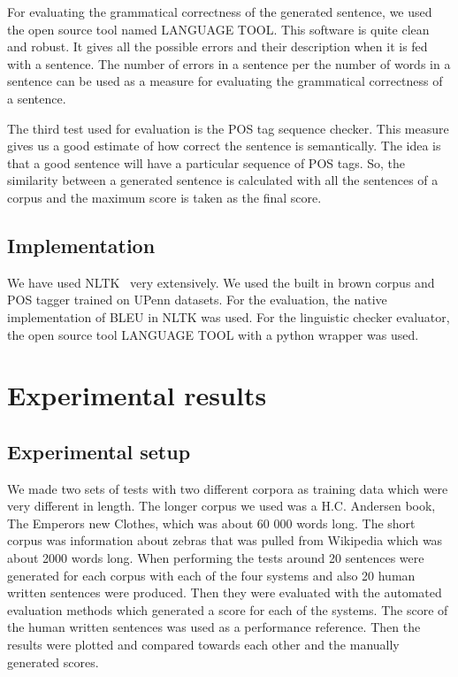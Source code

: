 \documentclass[a4paper,12pt]{article}
\begin{document}
For evaluating the grammatical correctness of the generated sentence, we used the
open source tool named LANGUAGE TOOL. This software is quite clean and robust. It gives 
all the possible errors and their description when it is fed with a sentence. The number 
of errors in a sentence per the number of words in a sentence can be used as a measure
for evaluating the grammatical correctness of a sentence.

The third test used for evaluation is the POS tag sequence checker. This measure 
gives us a good estimate of how correct the sentence is semantically. The idea
is that a good sentence will have a particular sequence of POS tags. So, the similarity
between a generated sentence is calculated with all the sentences of a corpus and the 
maximum score is taken as the final score. 

\subsection{Implementation}
\label{sec:impl}

We have used NLTK~\cite{nltk} very extensively. We used the built in brown
corpus and POS tagger trained on UPenn datasets. 
For the evaluation, the native implementation of BLEU in NLTK was used. 
For the linguistic checker evaluator, the open source tool LANGUAGE TOOL with a python
wrapper was used.

\section{Experimental results}
\label{sec:exps}

\subsection{Experimental setup}

We made two sets of tests with two different corpora as training data which were
very different in length.
The longer corpus we used was a H.C. Andersen book, The Emperors new Clothes,
which was about 60 000 words long.
The short corpus was information about zebras that was pulled from Wikipedia
which was about 2000 words long.
When performing the tests around 20 sentences were generated for each corpus 
with each of the four systems and also 20 human written sentences were produced. 
Then they were evaluated with the automated evaluation methods which generated
a score for each of the systems. The score of the human written sentences was 
used as a performance reference. Then the results were plotted and compared
towards each other and the manually generated scores.
\end{document}
